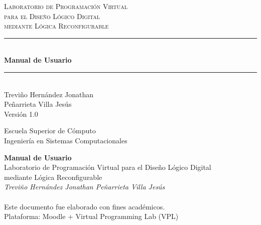 \documentclass[12pt, a4paper, twoside, openany]{book}
\begin{document}
\begin{titlepage}
  \pagecolor{PrimaryBlue}
  \color{white}
  \centering
  \vspace*{1.5cm}


  \vspace{1cm}
  {\fontsize{11}{13}\selectfont\scshape Laboratorio de Programación Virtual}\\[0.4cm]
  {\fontsize{11}{13}\selectfont\scshape para el Diseño Lógico Digital}\\[0.4cm]
  {\fontsize{11}{13}\selectfont\scshape mediante Lógica Reconfigurable}\\[1cm]

  {\color{AccentBlue!60}\rule{0.6\textwidth}{1pt}}\\[0.8cm]

  {\Huge\bfseries Manual de Usuario}\\[0.5cm]

  {\color{AccentBlue!60}\rule{0.6\textwidth}{1pt}}\\[2cm]

  {\large
    Treviño Hernández Jonathan\\[0.3cm]
    Peñarrieta Villa Jesús
  }\\[2.5cm]

  {\small\color{white!70} Versión 1.0 \textendash{} \the\year}

  \vfill
  {\small\color{white!60}
    Escuela Superior de Cómputo\\
    Ingeniería en Sistemas Computacionales
  }
  \vspace{1cm}
\end{titlepage}

\nopagecolor  %

\thispagestyle{empty}
\vspace*{\fill}
\begin{center}
  \small\color{DarkGray}
  \textbf{Manual de Usuario}\\
  Laboratorio de Programación Virtual para el Diseño Lógico Digital\\
  mediante Lógica Reconfigurable\\[1em]
  \textit{Treviño Hernández Jonathan \textendash{} Peñarrieta Villa Jesús}\\[1em]
  \the\year\\[2em]
  Este documento fue elaborado con fines académicos.\\
  Plataforma: Moodle + Virtual Programming Lab (VPL)
\end{center}
\vspace*{\fill}
\clearpage
\end{document}

